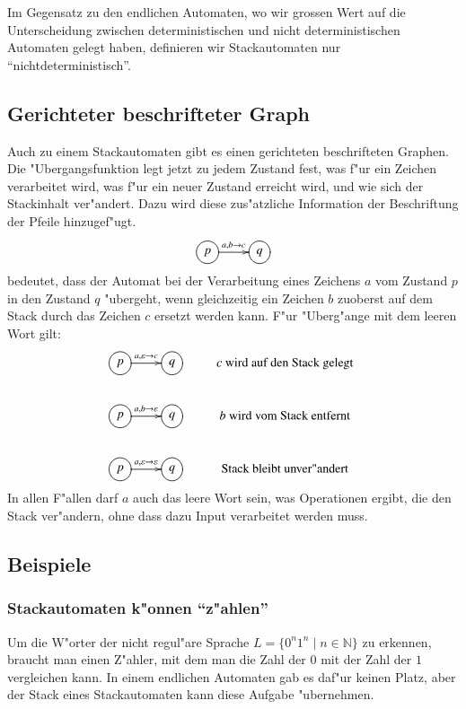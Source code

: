 Im Gegensatz zu den endlichen Automaten, wo wir grossen Wert auf die
Unterscheidung zwischen deterministischen und nicht deterministischen
Automaten gelegt haben, definieren wir Stackautomaten nur
``nichtdeterministisch''.

\subsection{Gerichteter beschrifteter Graph}
Auch zu einem Stackautomaten gibt es einen gerichteten beschrifteten
Graphen. Die "Ubergangsfunktion legt jetzt zu jedem Zustand 
fest, was f"ur ein Zeichen verarbeitet wird, was f"ur ein
neuer Zustand erreicht wird, und wie sich der Stackinhalt
ver"andert.
Dazu wird diese zus"atzliche Information der Beschriftung der Pfeile
hinzugef"ugt.
\[
\xymatrix{
*++[o][F]{p}\ar[r]^{a,b\to c}
	&*++[o][F]{q}
}
\]
bedeutet, dass der Automat bei der Verarbeitung eines Zeichens $a$
vom Zustand $p$ in den Zustand $q$ "ubergeht, wenn gleichzeitig
ein Zeichen $b$ zuoberst auf dem Stack durch das Zeichen $c$
ersetzt werden kann. F"ur "Uberg"ange mit dem leeren Wort gilt:
\[
\xymatrix{
*++[o][F]{p}\ar[r]^{a,\varepsilon\to c}
	&*++[o][F]{q}
		&\text{$c$ wird auf den Stack gelegt}
\\
*++[o][F]{p}\ar[r]^{a,b\to\varepsilon}
	&*++[o][F]{q}
		&\text{$b$ wird vom Stack entfernt}
\\
*++[o][F]{p}\ar[r]^{a,\varepsilon\to\varepsilon}
	&*++[o][F]{q}
		&\text{Stack bleibt unver"andert}
}
\]
In allen F"allen darf $a$ auch das leere Wort sein, was Operationen
ergibt, die den Stack ver"andern, ohne dass dazu Input verarbeitet werden
muss.


\subsection{Beispiele\label{stackbeispiele}}
\subsubsection{Stackautomaten k"onnen ``z"ahlen''}
Um die W"orter der nicht regul"are Sprache $L=\{0^n1^n\;|\;n\in \mathbb N\}$
zu erkennen, braucht man einen Z"ahler, mit dem man die Zahl der $0$
mit der Zahl der $1$ vergleichen kann. In einem endlichen Automaten
gab es daf"ur keinen Platz, aber der Stack eines Stackautomaten kann
diese Aufgabe "ubernehmen.


